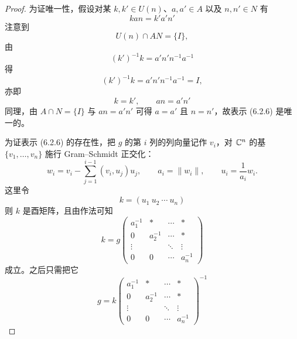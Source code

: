 \begin{proof}
为证唯一性，假设对某 $k,k'\in U(n)$、$a,a'\in A$ 以及 $n,n'\in N$ 有
\begin{equation}
  kan=k'a'n'
  \tag{6.2.7}
\end{equation}
注意到
\begin{equation}
  U(n)\cap AN=\{I\},
  \tag{6.2.8}
\end{equation}
由
\begin{equation}
  (k')^{-1}k=a'n'n^{-1}a^{-1}
  \tag{6.2.9}
\end{equation}
得
\begin{equation}
  (k')^{-1}k=a'n'n^{-1}a^{-1}=I,
  \tag{6.2.10}
\end{equation}
亦即
\begin{equation}
  k=k',\qquad an=a'n'
  \tag{6.2.11}
\end{equation}
同理，由 $A\cap N=\{I\}$ 与 $an=a'n'$ 可得 $a=a'$ 且 $n=n'$，故表示 (6.2.6) 是唯一的。

为证表示 (6.2.6) 的存在性，把 $g$ 的第 $i$ 列的列向量记作 $v_i$，对 $\mathbb{C}^n$ 的基 $\{v_1,\dots,v_n\}$ 施行 Gram–Schmidt 正交化：
\begin{equation}
  w_i=v_i-\sum_{j=1}^{i-1}(v_i,u_j)u_j,\qquad
  a_i=\|w_i\|,\qquad
  u_i=\frac{1}{a_i}w_i.
  \tag{6.2.12}
\end{equation}
这里令
\begin{equation}
  k=(u_1\ u_2\ \cdots\ u_n)
  \tag{6.2.13}
\end{equation}
则 $k$ 是酉矩阵，且由作法可知
\begin{equation}
  k=g\begin{pmatrix}
    a_1^{-1} & * & \cdots & *\\
    0 & a_2^{-1} & \cdots & *\\
    \vdots & & \ddots & \vdots\\
    0 & 0 & \cdots & a_n^{-1}
  \end{pmatrix}
  \tag{6.2.14}
\end{equation}
成立。之后只需把它
\begin{equation}
  g=k\begin{pmatrix}
    a_1^{-1} & * & \cdots & *\\
    0 & a_2^{-1} & \cdots & *\\
    \vdots & & \ddots & \vdots\\
    0 & 0 & \cdots & a_n^{-1}
  \end{pmatrix}^{-1}
  \tag{6.2.15}
\end{equation}


\end{proof}
